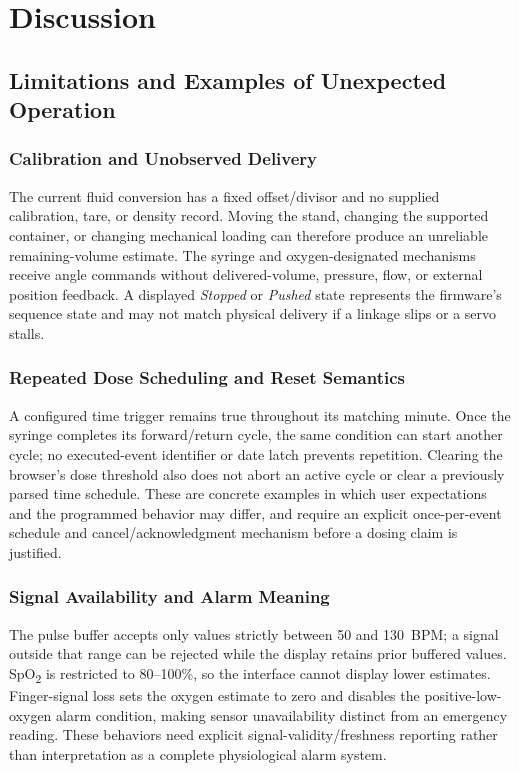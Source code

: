 \section{Discussion}\label{sec:discussion}
\subsection{Limitations and Examples of Unexpected Operation}
\subsubsection{Calibration and Unobserved Delivery}
The current fluid conversion has a fixed offset/divisor and no supplied calibration, tare, or density record. Moving the stand, changing the supported container, or changing mechanical loading can therefore produce an unreliable remaining-volume estimate. The syringe and oxygen-designated mechanisms receive angle commands without delivered-volume, pressure, flow, or external position feedback. A displayed \emph{Stopped} or \emph{Pushed} state represents the firmware's sequence state and may not match physical delivery if a linkage slips or a servo stalls.

\subsubsection{Repeated Dose Scheduling and Reset Semantics}
A configured time trigger remains true throughout its matching minute. Once the syringe completes its forward/return cycle, the same condition can start another cycle; no executed-event identifier or date latch prevents repetition. Clearing the browser's dose threshold also does not abort an active cycle or clear a previously parsed time schedule. These are concrete examples in which user expectations and the programmed behavior may differ, and require an explicit once-per-event schedule and cancel/acknowledgment mechanism before a dosing claim is justified.

\subsubsection{Signal Availability and Alarm Meaning}
The pulse buffer accepts only values strictly between 50 and 130~BPM; a signal outside that range can be rejected while the display retains prior buffered values. SpO\textsubscript{2} is restricted to 80--100\%, so the interface cannot display lower estimates. Finger-signal loss sets the oxygen estimate to zero and disables the positive-low-oxygen alarm condition, making sensor unavailability distinct from an emergency reading. These behaviors need explicit signal-validity/freshness reporting rather than interpretation as a complete physiological alarm system.

